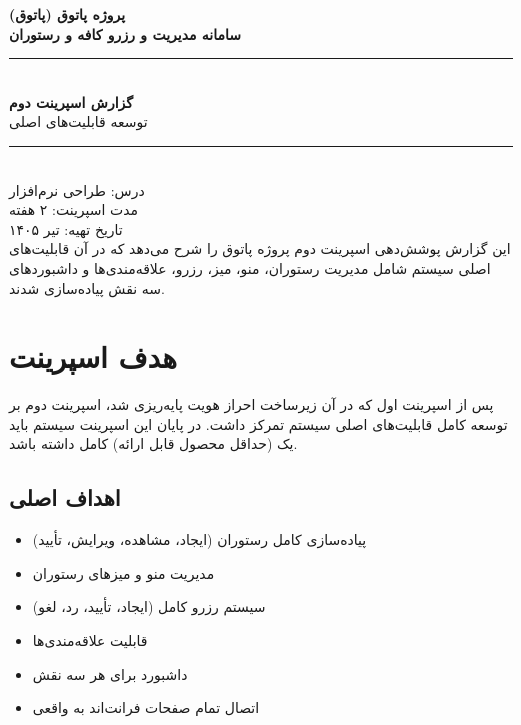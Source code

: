 \documentclass[12pt, a4paper]{article}
\begin{document}

\begin{titlepage}
\centering
\vspace*{2cm}
{\LARGE\bfseries پروژه پاتوق (پاتوق)\\[0.5em]}
{\Large\bfseries سامانه مدیریت و رزرو کافه و رستوران\\[2em]}
\rule{\linewidth}{0.5mm}\\[1em]
{\huge\bfseries\color{primaryorange} گزارش اسپرینت دوم}\\[0.5em]
{\Large توسعه قابلیت‌های اصلی}\\[1em]
\rule{\linewidth}{0.5mm}\\[2em]
{\large درس: طراحی نرم‌افزار\\[0.5em]}
{\large مدت اسپرینت: ۲ هفته\\[0.5em]}
{\large تاریخ تهیه: تیر ۱۴۰۵}\\[3em]
\vfill
{\normalsize\color{darkgray}
این گزارش پوشش‌دهی اسپرینت دوم پروژه پاتوق را شرح می‌دهد که
در آن قابلیت‌های اصلی سیستم شامل مدیریت رستوران، منو، میز،
رزرو، علاقه‌مندی‌ها و داشبوردهای سه نقش پیاده‌سازی شدند.}
\end{titlepage}

\tableofcontents
\newpage

\section{هدف اسپرینت}

پس از اسپرینت اول که در آن زیرساخت احراز هویت پایه‌ریزی شد، اسپرینت دوم بر توسعه
کامل قابلیت‌های اصلی سیستم تمرکز داشت. در پایان این اسپرینت سیستم باید یک
 (حداقل محصول قابل ارائه) کامل داشته باشد.

\subsection{اهداف اصلی}
\begin{itemize}[rightmargin=0.5cm]
  \item پیاده‌سازی  کامل رستوران (ایجاد، مشاهده، ویرایش، تأیید)
  \item مدیریت منو و میزهای رستوران
  \item سیستم رزرو کامل (ایجاد، تأیید، رد، لغو)
  \item قابلیت علاقه‌مندی‌ها
  \item داشبورد برای هر سه نقش
  \item اتصال تمام صفحات فرانت‌اند به  واقعی
\end{itemize}
\end{document}
